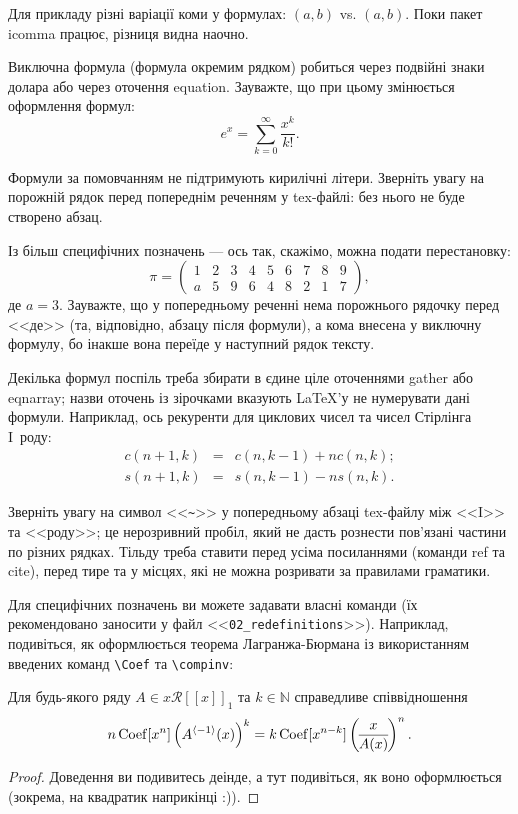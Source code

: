 Для прикладу різні варіації коми у формулах: $(a, b)$ vs. $(a,b)$. Поки
пакет icomma працює, різниця видна наочно.

Виключна формула (формула окремим рядком) робиться через подвійні знаки
долара або через оточення equation. Зауважте, що при цьому змінюється
оформлення формул:
$$e^x = \sum_{k = 0}^{\infty} {\frac{x^k}{k!}}.$$

Формули за помовчанням не підтримують кирилічні літери. Зверніть увагу на
порожній рядок перед попереднім реченням у tex-файлі: без нього не буде
створено абзац.

Із більш специфічних позначень --- ось так, скажімо, можна подати
перестановку:
$$\pi = \begin{pmatrix}
1 & 2 & 3 & 4 & 5 & 6 & 7 & 8 & 9\\
a & 5 & 9 & 6 & 4 & 8 & 2 & 1 & 7
\end{pmatrix},$$
де $a=3$. Зауважте, що у попередньому реченні нема порожнього рядочку
перед <<де>> (та, відповідно, абзацу після формули), а кома внесена у
виключну формулу, бо інакше вона переїде у наступний рядок тексту.

Декілька формул поспіль треба збирати в єдине ціле оточеннями gather або
eqnarray; назви оточень із зірочками вказують \LaTeX'у не нумерувати дані
формули. Наприклад, ось рекуренти для циклових чисел та чисел Стірлінга
I~роду:
\begin{eqnarray*}
c(n+1, k) &=& c(n, k-1)+nc(n, k); \\
s(n+1, k) &=& s(n, k-1)-ns(n, k).
\end{eqnarray*}

Зверніть увагу на символ <<\verb|~|>> у попередньому абзаці tex-файлу між
<<I>> та <<роду>>; це нерозривний пробіл, який не дасть рознести пов'язані
частини по різних рядках. Тільду треба ставити перед усіма посиланнями
(команди ref та cite), перед тире та у місцях, які не можна розривати за
правилами граматики.

Для специфічних позначень ви можете задавати власні команди (їх
рекомендовано заносити у файл <<\verb|02_redefinitions|>>). Наприклад,
подивіться, як оформлюється теорема Лагранжа-Бюрмана із використанням
введених команд \verb|\Coef| та \verb|\compinv|:

\begin{theorem} \label{thLagrangeBurmann}
Для будь-якого ряду $A \in x \mathcal R[[x]]_1$ та $k \in \mathbb N$ справедливе співвідношення
$$n \operatorname{Coef}[x^n] \left( A^{\left\langle -1 \right\rangle}(x) \right)^k = k \operatorname{Coef}[x^{n-k}] \left(\! \frac{x}{A(x)} \!\right)^n.$$
\end{theorem}
\begin{proof}
Доведення ви подивитесь деінде, а тут подивіться, як воно оформлюється
(зокрема, на квадратик наприкінці :)).
\end{proof}

